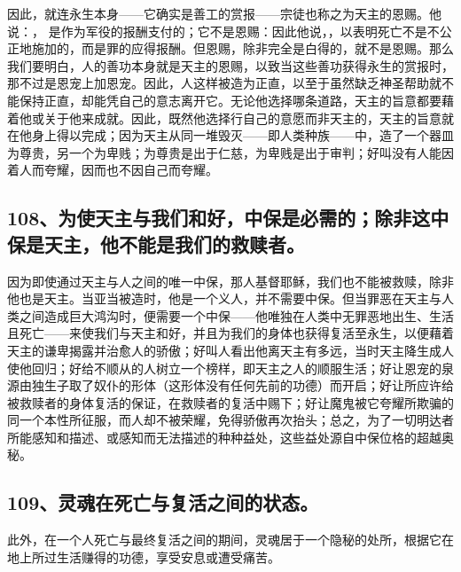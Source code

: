 因此，就连永生本身——它确实是善工的赏报——宗徒也称之为天主的恩赐。他说：， 是作为军役的报酬支付的；它不是恩赐：因此他说，，以表明死亡不是不公正地施加的，而是罪的应得报酬。但恩赐，除非完全是白得的，就不是恩赐。那么我们要明白，人的善功本身就是天主的恩赐，以致当这些善功获得永生的赏报时，那不过是恩宠上加恩宠。因此，人这样被造为正直，以至于虽然缺乏神圣帮助就不能保持正直，却能凭自己的意志离开它。无论他选择哪条道路，天主的旨意都要藉着他或关于他来成就。因此，既然他选择行自己的意愿而非天主的，天主的旨意就在他身上得以完成；因为天主从同一堆毁灭——即人类种族——中，造了一个器皿为尊贵，另一个为卑贱；为尊贵是出于仁慈，为卑贱是出于审判；好叫没有人能因着人而夸耀，因而也不因自己而夸耀。\par


\subsection{108、为使天主与我们和好，中保是必需的；除非这中保是天主，他不能是我们的救赎者。}

因为即使通过天主与人之间的唯一中保，那人基督耶稣，我们也不能被救赎，除非他也是天主。当亚当被造时，他是一个义人，并不需要中保。但当罪恶在天主与人类之间造成巨大鸿沟时，便需要一个中保——他唯独在人类中无罪恶地出生、生活且死亡——来使我们与天主和好，并且为我们的身体也获得复活至永生，以便藉着天主的谦卑揭露并治愈人的骄傲；好叫人看出他离天主有多远，当时天主降生成人使他回归；好给不顺从的人树立一个榜样，即天主之人的顺服生活；好让恩宠的泉源由独生子取了奴仆的形体（这形体没有任何先前的功德）而开启；好让所应许给被救赎者的身体复活的保证，在救赎者的复活中赐下；好让魔鬼被它夸耀所欺骗的同一个本性所征服，而人却不被荣耀，免得骄傲再次抬头；总之，为了一切明达者所能感知和描述、或感知而无法描述的种种益处，这些益处源自中保位格的超越奥秘。\par


\subsection{109、灵魂在死亡与复活之间的状态。}

此外，在一个人死亡与最终复活之间的期间，灵魂居于一个隐秘的处所，根据它在地上所过生活赚得的功德，享受安息或遭受痛苦。\par

